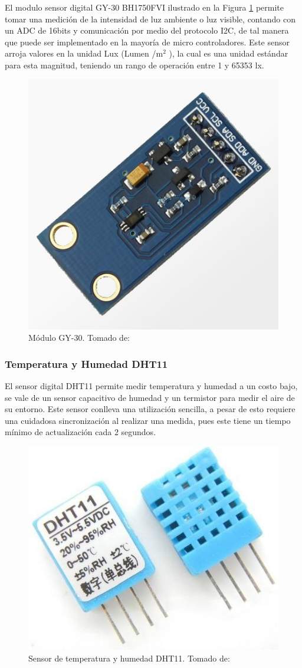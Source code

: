 El modulo sensor digital GY-30 BH1750FVI ilustrado en la Figura \ref{fig:gy-30} permite tomar una medición de la intensidad de luz ambiente o luz visible, contando con un ADC de 16bits y comunicación por medio del protocolo I2C, de tal manera que puede ser implementado en la mayoría de micro controladores. Este sensor arroja valores en la unidad Lux (Lumen /m$^2$ ), la cual es una unidad estándar para esta magnitud, teniendo un rango de operación entre 1 y 65353 lx.\cite{GY30}\\

\begin{figure}[H]
	\centering
	\caption[Módulo GY-30.]{Módulo GY-30. Tomado de: \cite{GY30}}
	\label{fig:gy-30}
	\includegraphics[width=0.4\linewidth]{Imagenes/gy-30}
\end{figure}

\subsubsection{Temperatura y Humedad DHT11}

El sensor digital DHT11 permite medir temperatura y humedad a un costo bajo, se vale de un sensor capacitivo de humedad y un termistor para medir el aire de su entorno. Este sensor conlleva una utilización sencilla, a pesar de esto requiere una cuidadosa sincronización al realizar una medida, pues este tiene un tiempo mínimo de actualización cada 2 segundos. \cite{DHT11}\\

\begin{figure}[H]
	\centering
	\caption[Sensor de temperatura y humedad DHT11.]{Sensor de temperatura y humedad DHT11. Tomado de: \cite{DHT11}}
	\label{fig:dht11}
	\includegraphics[width=0.4\linewidth]{Imagenes/dht11}
\end{figure}


